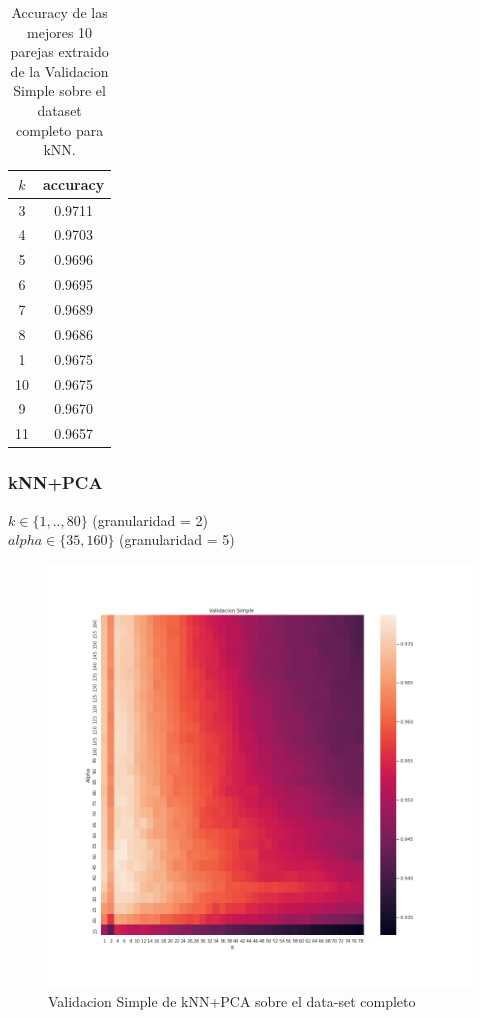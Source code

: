 \documentclass[a4paper,10pt]{article}
\begin{document}
\begin{table}[h!]
    \begin{center}
        \begin{tabular}{|c|c|}
        \hline
        \textbf{$k$} & \textbf{accuracy} \\
        \hline
        3 &  0.9711\\
        4 & 0.9703\\
        5 & 0.9696\\
        6 & 0.9695\\
        7 &  0.9689\\
        8 & 0.9686\\
        1 & 0.9675\\
        10 & 0.9675\\
        9 & 0.9670\\
        11 & 0.9657\\
        
        \hline
        \end{tabular}
        \caption{Accuracy de las mejores 10 parejas extraido de la Validacion Simple sobre el dataset completo para kNN.}
        \label{knn_valSimple_table}
    \end{center}
\end{table}

\subsubsection{kNN+PCA}

\par

$ k \in \{1,..,80\}$ (granularidad = 2)\\$alpha \in \{  35, 160 \}$ (granularidad = 5)

\begin{figure}[H]
    \centering
    \includegraphics[width=12cm]{../images/validacionSimple_datasetCompleto_knnpca_k80}%
    \qquad
    \caption{Validacion Simple de kNN+PCA sobre el data-set completo}
    \label{knnpca_preliminar}%
\end{figure}
\end{document}
